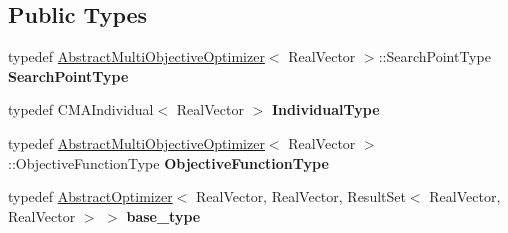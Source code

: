 \subsection*{Public Types}
\begin{DoxyCompactItemize}
\item 
typedef \hyperlink{classAbstractMultiObjectiveOptimizer}{Abstract\+Multi\+Objective\+Optimizer}$<$ Real\+Vector $>$\+::Search\+Point\+Type {\bfseries Search\+Point\+Type}\hypertarget{classIndicatorBasedMOCMA__mod_a4bdfc46e94600d8114508e9de42b7d35}{}\label{classIndicatorBasedMOCMA__mod_a4bdfc46e94600d8114508e9de42b7d35}

\item 
typedef C\+M\+A\+Individual$<$ Real\+Vector $>$ {\bfseries Individual\+Type}\hypertarget{classIndicatorBasedMOCMA__mod_a9e7d5ad11afb8ee68723069e1e5a3699}{}\label{classIndicatorBasedMOCMA__mod_a9e7d5ad11afb8ee68723069e1e5a3699}

\item 
typedef \hyperlink{classAbstractMultiObjectiveOptimizer}{Abstract\+Multi\+Objective\+Optimizer}$<$ Real\+Vector $>$\+::Objective\+Function\+Type {\bfseries Objective\+Function\+Type}\hypertarget{classIndicatorBasedMOCMA__mod_a1606f3fc8f495ef9729493be7dbc41f9}{}\label{classIndicatorBasedMOCMA__mod_a1606f3fc8f495ef9729493be7dbc41f9}

\item 
typedef \hyperlink{classAbstractOptimizer}{Abstract\+Optimizer}$<$ Real\+Vector, Real\+Vector, Result\+Set$<$ Real\+Vector, Real\+Vector $>$ $>$ {\bfseries base\+\_\+type}\hypertarget{classAbstractPreselecter_a9d56c27fc2428c60a99dea0504717794}{}\label{classAbstractPreselecter_a9d56c27fc2428c60a99dea0504717794}

\end{DoxyCompactItemize}

